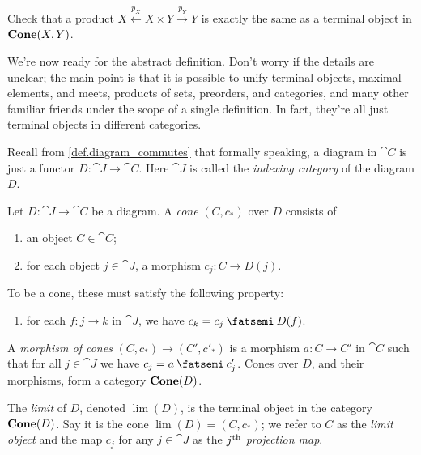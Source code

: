 \documentclass[7Sketches]{subfiles}
\begin{document}
\begin{exercise}%
\label{exc.prod_as_term_cone}
Check that a product $X \xleftarrow{p_X} X\times Y\xrightarrow{p_Y} Y$ is
exactly the same as a terminal object in $\mathbf{Cone}(X,Y)$.
\end{exercise}

We're now ready for the abstract definition. Don't worry if the details are
unclear; the main point is that it is possible to unify terminal objects, maximal
elements, and meets, products of sets, preorders, and categories, and many other familiar
friends under the scope of a single definition. In fact, they're all just terminal objects in different categories.

Recall from \cref{def.diagram_commutes} that formally speaking, a diagram in $\cat{C}$ is just a functor $D\colon\cat{J}\to\cat{C}$. Here $\cat{J}$ is called the \emph{indexing category} of the diagram $D$.%

\begin{definition}%
\label{def.cones_limits}%
%
Let $D\colon \cat{J}\to \cat{C}$ be a diagram. A \emph{cone} $(C,c_\ast)$ over $D$ consists of 
\begin{enumerate}[label=(\roman*)]
\item an object $C \in \cat{C}$;
\item for each object $j \in \cat{J}$, a morphism $c_j\colon C \to D(j)$.
\end{enumerate}
To be a cone, these must satisfy the following property:
\begin{enumerate}[label=(\alph*)]
\item for each $f\colon j \to k$ in $\cat{J}$, we have $c_k=c_j\cp D(f)$.
\end{enumerate}
%

A \emph{morphism of cones} $(C,c_\ast) \to (C',c'_\ast)$ is a morphism $a\colon C \to
C'$ in $\cat{C}$ such that for all $j \in \cat{J}$ we have $c_j=a\cp c'_j$.
Cones over $D$, and their morphisms, form a category $\mathbf{Cone}(D)$.

The \emph{limit} of $D$, denoted $\lim(D)$, is the terminal object in the category
$\mathbf{Cone}(D)$. Say it is the cone $\lim(D)=(C,c_*)$; we refer to $C$ as the \emph{limit object} and the map $c_j$ for any $j\in\cat{J}$ as the \emph{$j^{\textnormal{th}}$ projection map}.
\end{definition}
\end{document}
